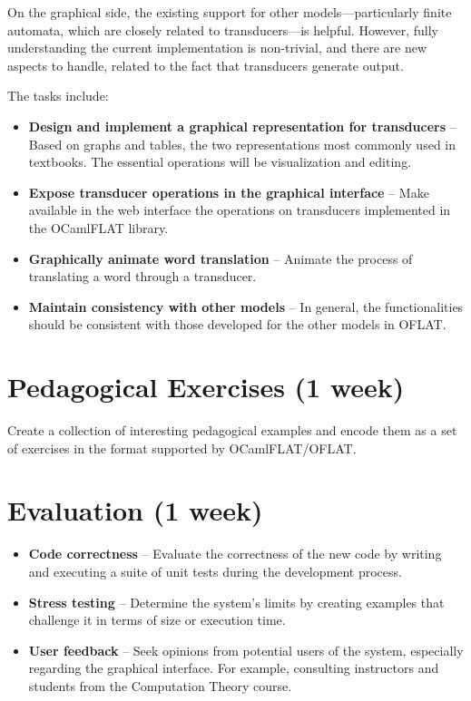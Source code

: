 On the graphical side, the existing support for other models---particularly finite automata, which are closely related to transducers---is helpful. However, fully understanding the current implementation is non-trivial, and there are new aspects to handle, related to the fact that transducers generate output.

The tasks include:

\begin{itemize}
    \item \textbf{Design and implement a graphical representation for transducers} -- Based on graphs and tables, the two representations most commonly used in textbooks. The essential operations will be visualization and editing.

    \item \textbf{Expose transducer operations in the graphical interface} -- Make available in the web interface the operations on transducers implemented in the OCamlFLAT library.

    \item \textbf{Graphically animate word translation} -- Animate the process of translating a word through a transducer.

    \item \textbf{Maintain consistency with other models} -- In general, the functionalities should be consistent with those developed for the other models in OFLAT.
\end{itemize}

\section{Pedagogical Exercises (1 week)}

Create a collection of interesting pedagogical examples and encode them as a set of exercises in the format supported by OCamlFLAT/OFLAT.

\section{Evaluation (1 week)}

\begin{itemize}
    \item \textbf{Code correctness} -- Evaluate the correctness of the new code by writing and executing a suite of unit tests during the development process.

    \item \textbf{Stress testing} -- Determine the system’s limits by creating examples that challenge it in terms of size or execution time.

    \item \textbf{User feedback} -- Seek opinions from potential users of the system, especially regarding the graphical interface. For example, consulting instructors and students from the Computation Theory course.
\end{itemize}

